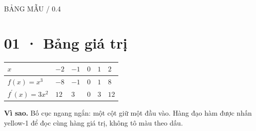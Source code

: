 \documentclass[11pt,a4paper]{article}
\newcommand{\tagline}[1]{{\small\color{muted}\MakeUppercase{#1}}\par}
\newcommand{\why}[1]{\par{\small\color{muted}\textbf{Vì sao.} #1}\par}
\begin{document}
\tagline{Bảng mẫu / 0.4}\section*{01 · Bảng giá trị}
\begin{tabularx}{\linewidth}{|>{\raggedright\arraybackslash}p{.28\linewidth}|>{\centering\arraybackslash}X|>{\centering\arraybackslash}X|>{\centering\arraybackslash}X|>{\centering\arraybackslash}X|>{\centering\arraybackslash}X|}\hline
\rowcolor{head}$x$ & $-2$ & $-1$ & $0$ & $1$ & $2$\\\hline
$f(x)=x^3$ & $-8$ & $-1$ & $0$ & $1$ & $8$\\\hline
\rowcolor{focus}$f^{\prime}(x)=3x^2$ & $12$ & $3$ & $0$ & $3$ & $12$\\\hline
\end{tabularx}\why{Bố cục ngang ngắn: một cột giữ một đầu vào. Hàng đạo hàm được nhấn yellow-1 để đọc cùng hàng giá trị, không tô màu theo dấu.}
\end{document}
